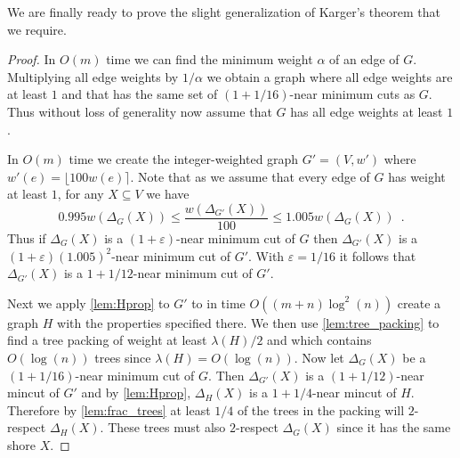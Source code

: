 We are finally ready to prove the slight generalization of Karger's theorem that we require.
\kargerthm*

\begin{proof}
In $O(m)$ time we can find the minimum weight $\alpha$ of an edge of $G$.  Multiplying all edge weights by $1/\alpha$ we obtain a graph where all edge weights are at least $1$ and that has the same 
set of $(1+1/16)$-near minimum cuts as $G$.  Thus without loss of generality now assume that $G$ has all edge weights at least $1$.  

In $O(m)$ time we create the integer-weighted graph $G' = (V,w')$ where $w'(e) = \lfloor 100w(e) \rceil$.  Note that as we assume that every edge of $G$ has weight at least $1$, for any 
$X \subseteq V$ we have
\begin{equation}
\label{eq:int_approx}
0.995 w(\Delta_G(X)) \le \frac{ w(\Delta_{G'}(X))}{100} \le 1.005 w(\Delta_G(X)) \enspace .
\end{equation}
Thus if $\Delta_G(X)$ is a $(1+ \varepsilon)$-near minimum cut of $G$ then $\Delta_{G'}(X)$ is a $(1+\varepsilon)(1.005)^2$-near minimum cut of $G'$.  With $\varepsilon = 1/16$ 
it follows that $\Delta_{G'}(X)$ is a $1+1/12$-near minimum cut of $G'$.

Next we apply \cref{lem:Hprop} to $G'$ to in time $O((m + n) \log^2(n))$ create a graph $H$ with the properties specified there.  We then use \cref{lem:tree_packing} to find a tree packing 
of weight at least $\lambda(H)/2$ and which contains $O(\log(n))$ trees since $\lambda(H) = O(\log(n))$.  Now let $\Delta_G(X)$ be a $(1+1/16)$-near minimum cut of $G$. 
Then $\Delta_{G'}(X)$ is a $(1+1/12)$-near mincut of $G'$ and by \cref{lem:Hprop}, $\Delta_H(X)$ is a $1+1/4$-near mincut of $H$.  
Therefore by \cref{lem:frac_trees} at least $1/4$ of the trees in the packing will $2$-respect $\Delta_H(X)$.  
These trees must also $2$-respect $\Delta_G(X)$ since it has the same shore $X$.
\end{proof}

